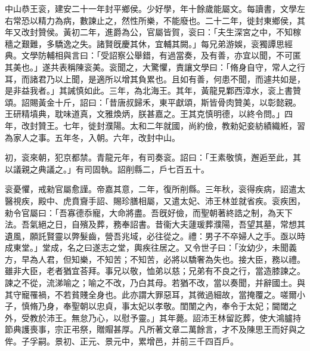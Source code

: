 \begin{pinyinscope}
 
 
 中山恭王衮，建安二十一年封平鄉侯。少好學，年十餘歲能屬文。每讀書，文學左右常恐以精力為病，數諫止之，然性所樂，不能廢也。二十二年，徙封東鄉侯，其年又改封贊侯。黃初二年，進爵為公，官屬皆賀，衮曰：「夫生深宮之中，不知稼穡之艱難，多驕逸之失。諸賢旣慶其休，宜輔其闕。」每兄弟游娛，衮獨譚思經典。文學防輔相與言曰：「受詔察公舉錯，有過當奏，及有善，亦宜以聞，不可匿其美也。」遂共表稱陳衮美。衮聞之，大驚懼，責讓文學曰：「脩身自守，常人之行耳，而諸君乃以上聞，是適所以增其負累也。且如有善，何患不聞，而遽共如是，是非益我者。」其誡慎如此。三年，為北海王。其年，黃龍見鄴西漳水，衮上書贊頌。詔賜黃金十斤，詔曰：「昔唐叔歸禾，東平獻頌，斯皆骨肉贊美，以彰懿親。王研精墳典，耽味道真，文雅煥炳，朕甚嘉之。王其克慎明德，以終令問。」四年，改封贊王。七年，徙封濮陽。太和二年就國，尚約儉，教勑妃妾紡績織絍，習為家人之事。五年冬，入朝。六年，改封中山。
 
 
 
 
 初，衮來朝，犯京都禁。青龍元年，有司奏衮。詔曰：「王素敬慎，邂逅至此，其以議親之典議之。」有司固執。詔削縣二，戶七百五十。
 
 
 衮憂懼，戒勑官屬愈謹。帝嘉其意，二年，復所削縣。三年秋，衮得疾病，詔遣太醫視疾，殿中、虎賁齎手詔、賜珍膳相屬，又遣太妃、沛王林並就省疾。衮疾困，勑令官屬曰：「吾寡德忝寵，大命將盡。吾旣好儉，而聖朝著終誥之制，為天下法。吾氣絕之日，自殯及葬，務奉詔書。昔衞大夫蘧瑗葬濮陽，吾望其墓，常想其遺風，願託賢靈以弊髮齒，營吾兆域，必往從之。禮：男子不卒婦人之手。亟以時成東堂。」堂成，名之曰遂志之堂，輿疾往居之。又令世子曰：「汝幼少，未聞義方，早為人君，但知樂，不知苦；不知苦，必將以驕奢為失也。接大臣，務以禮。雖非大臣，老者猶宜荅拜。事兄以敬，恤弟以慈；兄弟有不良之行，當造膝諫之。諫之不從，流涕喻之；喻之不改，乃白其母。若猶不改，當以奏聞，并辭國土。與其守寵罹禍，不若貧賤全身也。此亦謂大罪惡耳，其微過細故，當掩覆之。嗟爾小子，慎脩乃身，奉聖朝以忠貞，事太妃以孝敬。閨闈之內，奉令于太妃；閫閾之外，受教於沛王。無怠乃心，以慰予靈。」其年薨。詔沛王林留訖葬，使大鴻臚持節典護喪事，宗正弔祭，贈賵甚厚。凡所著文章二萬餘言，才不及陳思王而好與之侔。子孚嗣。景初、正元、景元中，累增邑，并前三千四百戶。
 
 
\end{pinyinscope}